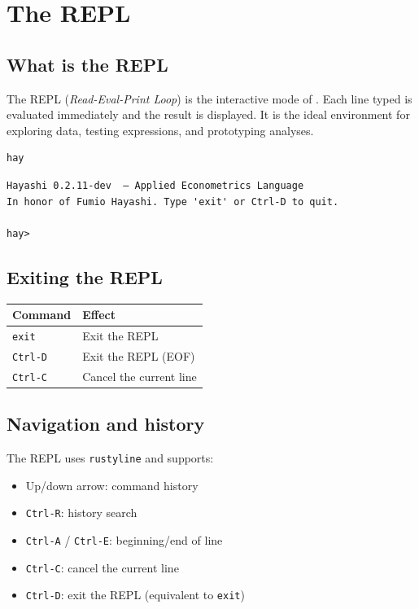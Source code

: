 \chapter{The REPL}

\section{What is the REPL}

The REPL (\textit{Read-Eval-Print Loop}) is the interactive mode of
\hayashi{}. Each line typed is evaluated immediately and the result is
displayed. It is the ideal environment for exploring data, testing
expressions, and prototyping analyses.

\begin{lstlisting}[style=inline, language=sh]
hay
\end{lstlisting}

\begin{lstlisting}[style=inline]
Hayashi 0.2.11-dev  — Applied Econometrics Language
In honor of Fumio Hayashi. Type 'exit' or Ctrl-D to quit.

hay>
\end{lstlisting}

\section{Exiting the REPL}

\begin{center}
\begin{tabular}{ll}
\toprule
\textbf{Command} & \textbf{Effect} \\
\midrule
\texttt{exit}   & Exit the REPL \\
\texttt{Ctrl-D} & Exit the REPL (EOF) \\
\texttt{Ctrl-C} & Cancel the current line \\
\bottomrule
\end{tabular}
\end{center}

\section{Navigation and history}

The REPL uses \texttt{rustyline} and supports:

\begin{itemize}
  \item Up/down arrow: command history
  \item \texttt{Ctrl-R}: history search
  \item \texttt{Ctrl-A} / \texttt{Ctrl-E}: beginning/end of line
  \item \texttt{Ctrl-C}: cancel the current line
  \item \texttt{Ctrl-D}: exit the REPL (equivalent to \texttt{exit})
\end{itemize}

